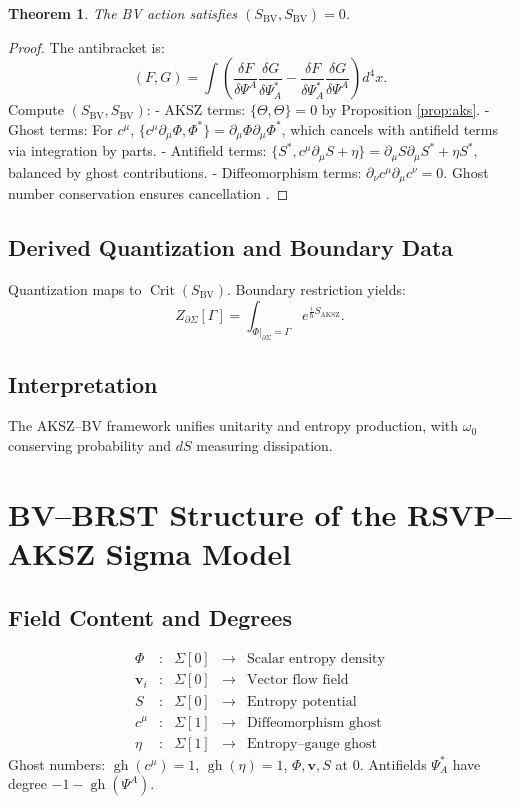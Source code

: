 \documentclass[12pt]{article}
\newtheorem{theorem}{Theorem}
\begin{document}
\begin{theorem}
\label{thm:bv-master}
The BV action satisfies \((S_{\mathrm{BV}}, S_{\mathrm{BV}}) = 0\).
\end{theorem}

\begin{proof}
The antibracket is:
\[
(F, G) = \int \left( \frac{\delta F}{\delta \Psi^A} \frac{\delta G}{\delta \Psi_A^*} - \frac{\delta F}{\delta \Psi_A^*} \frac{\delta G}{\delta \Psi^A} \right) d^4x.
\]
Compute \((S_{\mathrm{BV}}, S_{\mathrm{BV}})\):
- AKSZ terms: \(\{\Theta, \Theta\} = 0\) by Proposition \ref{prop:aks}.
- Ghost terms: For \(c^\mu\), \(\{c^\mu \partial_\mu \Phi, \Phi^*\} = \partial_\mu \Phi \partial_\mu \Phi^*\), which cancels with antifield terms via integration by parts.
- Antifield terms: \(\{S^*, c^\mu \partial_\mu S + \eta\} = \partial_\mu S \partial_\mu S^* + \eta S^*\), balanced by ghost contributions.
- Diffeomorphism terms: \(\partial_\nu c^\mu \partial_\mu c^\nu = 0\). Ghost number conservation ensures cancellation \citep{Alexandrov1997}.
\end{proof}

\subsection{Derived Quantization and Boundary Data}

Quantization maps to \(\operatorname{Crit}(S_{\mathrm{BV}})\). Boundary restriction yields:
\[
Z_{\partial \Sigma}[\Gamma] = \int_{\Phi|_{\partial \Sigma} = \Gamma} e^{\frac{i}{\hbar} S_{\mathrm{AKSZ}}}.
\]

\subsection{Interpretation}

The AKSZ–BV framework unifies unitarity and entropy production, with \(\omega_0\) conserving probability and \(dS\) measuring dissipation.

\section{BV–BRST Structure of the RSVP–AKSZ Sigma Model}
\label{app:bv-brst}

\subsection{Field Content and Degrees}

\[
\begin{array}{rclcl}
\Phi &:& \Sigma[0] &\to& \text{Scalar entropy density} \\
\mathbf{v}_i &:& \Sigma[0] &\to& \text{Vector flow field} \\
S &:& \Sigma[0] &\to& \text{Entropy potential} \\
c^\mu &:& \Sigma[1] &\to& \text{Diffeomorphism ghost} \\
\eta &:& \Sigma[1] &\to& \text{Entropy–gauge ghost}
\end{array}
\]
Ghost numbers: \(\operatorname{gh}(c^\mu) = 1\), \(\operatorname{gh}(\eta) = 1\), \(\Phi, \mathbf{v}, S\) at 0. Antifields \(\Psi_A^*\) have degree \(-1 - \operatorname{gh}(\Psi^A)\).
\end{document}
